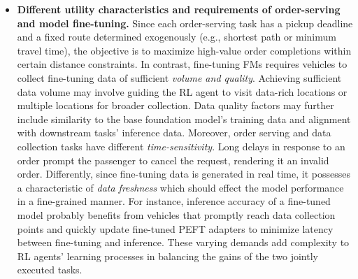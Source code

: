 \begin{itemize}
\smallskip
\item{{\bf Different utility characteristics and requirements of order-serving and model fine-tuning.} %
Since each order-serving task has a pickup deadline and a fixed route determined exogenously (e.g., shortest path or minimum travel time), the objective is to maximize high-value order completions within certain distance constraints. In contrast, fine-tuning FMs requires vehicles to collect fine-tuning data of sufficient {\em volume and quality}. Achieving sufficient data volume may involve guiding the RL agent to visit data-rich locations or multiple locations for broader collection. Data quality factors may further include similarity to the base foundation model's training data and alignment with downstream tasks' inference data. %
Moreover, order serving and data collection tasks have different {\em time-sensitivity}. Long delays in response to an order prompt the passenger to cancel the request, rendering it an invalid order. Differently, since fine-tuning data is generated in real time, it possesses a characteristic of {\em data freshness} which should effect the model performance in a fine-grained manner. For instance, inference accuracy of a fine-tuned model probably benefits from vehicles that promptly reach data collection points and quickly update fine-tuned PEFT adapters to minimize latency between fine-tuning and inference. These varying demands add complexity to RL agents' learning processes in balancing the gains of the two jointly executed tasks.}

\end{itemize}
